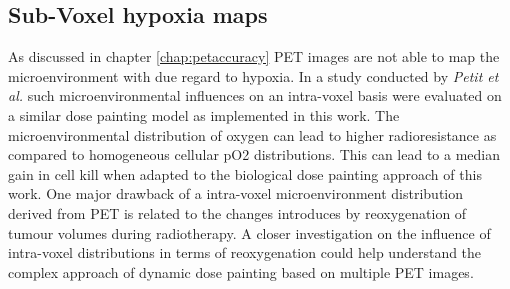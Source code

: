 \subsection{Sub-Voxel hypoxia maps}
As discussed in chapter \ref{chap:petaccuracy} PET images are not able to map the microenvironment with due regard to hypoxia. In a study conducted by \textit{Petit et al.}\cite{pmid19293465} such microenvironmental influences on an intra-voxel basis were evaluated on a similar dose painting model as implemented in this work. The microenvironmental distribution of oxygen can lead to higher radioresistance as compared to homogeneous cellular pO2 distributions. This can lead to a median gain in cell kill when adapted to the biological dose painting approach of this work. One major drawback of a intra-voxel microenvironment distribution derived from PET is related to the changes introduces by reoxygenation of tumour volumes during radiotherapy. A closer investigation on the influence of intra-voxel distributions in terms of reoxygenation could help understand the complex approach of dynamic dose painting based on multiple PET images.
